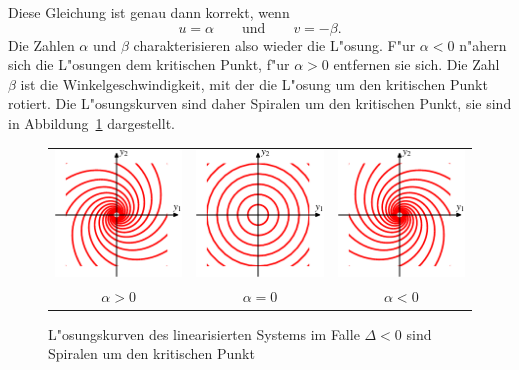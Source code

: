 Diese Gleichung ist genau dann korrekt, wenn 
\[
u=\alpha
\qquad\text{und}\qquad
v=-\beta.
\]
Die Zahlen $\alpha$ und $\beta$ charakterisieren also wieder die L"osung.
F"ur $\alpha < 0$ n"ahern sich die L"osungen dem kritischen Punkt, f"ur
$\alpha>0$ entfernen sie sich.
Die Zahl $\beta$ ist die Winkelgeschwindigkeit, mit der die L"osung
um den kritischen Punkt rotiert.
Die L"osungskurven sind daher Spiralen um den kritischen Punkt, sie
sind in Abbildung~\ref{geometrie:rotkurv} dargestellt.
\begin{figure}
\centering
\begin{tabular}{ccc}
\includegraphics{chapters/images/geometrie-9.pdf}&%
\includegraphics{chapters/images/geometrie-11.pdf}&%
\includegraphics{chapters/images/geometrie-10.pdf}\\
$\alpha > 0$&$\alpha = 0$&$\alpha < 0$
\end{tabular}
\caption{L"osungskurven des linearisierten Systems im Falle $\Delta < 0$
sind Spiralen um den kritischen Punkt
\label{geometrie:rotkurv}}
\end{figure}

